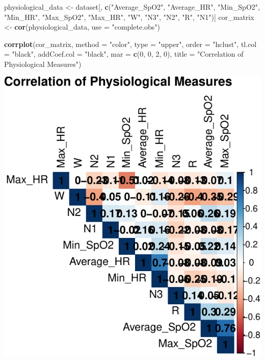 \documentclass[
]{article}
\newenvironment{Shaded}{\begin{snugshade}}{\end{snugshade}}
\newcommand{\AttributeTok}[1]{\textcolor[rgb]{0.13,0.29,0.53}{#1}}
\newcommand{\DecValTok}[1]{\textcolor[rgb]{0.00,0.00,0.81}{#1}}
\newcommand{\FunctionTok}[1]{\textcolor[rgb]{0.13,0.29,0.53}{\textbf{#1}}}
\newcommand{\NormalTok}[1]{#1}
\newcommand{\OtherTok}[1]{\textcolor[rgb]{0.56,0.35,0.01}{#1}}
\newcommand{\StringTok}[1]{\textcolor[rgb]{0.31,0.60,0.02}{#1}}
\begin{document}
\begin{Shaded}
\begin{Highlighting}[]
\NormalTok{physiological\_data }\OtherTok{\textless{}{-}}\NormalTok{ dataset[, }\FunctionTok{c}\NormalTok{(}\StringTok{"Average\_SpO2"}\NormalTok{, }\StringTok{"Average\_HR"}\NormalTok{,}
    \StringTok{"Min\_SpO2"}\NormalTok{, }\StringTok{"Min\_HR"}\NormalTok{, }\StringTok{"Max\_SpO2"}\NormalTok{, }\StringTok{"Max\_HR"}\NormalTok{, }\StringTok{"W"}\NormalTok{, }\StringTok{"N3"}\NormalTok{, }\StringTok{"N2"}\NormalTok{,}
    \StringTok{"R"}\NormalTok{, }\StringTok{"N1"}\NormalTok{)]}
\NormalTok{cor\_matrix }\OtherTok{\textless{}{-}} \FunctionTok{cor}\NormalTok{(physiological\_data, }\AttributeTok{use =} \StringTok{"complete.obs"}\NormalTok{)}

\FunctionTok{corrplot}\NormalTok{(cor\_matrix, }\AttributeTok{method =} \StringTok{"color"}\NormalTok{, }\AttributeTok{type =} \StringTok{"upper"}\NormalTok{, }\AttributeTok{order =} \StringTok{"hclust"}\NormalTok{,}
    \AttributeTok{tl.col =} \StringTok{"black"}\NormalTok{, }\AttributeTok{addCoef.col =} \StringTok{"black"}\NormalTok{, }\AttributeTok{mar =} \FunctionTok{c}\NormalTok{(}\DecValTok{0}\NormalTok{, }\DecValTok{0}\NormalTok{, }\DecValTok{2}\NormalTok{,}
        \DecValTok{0}\NormalTok{), }\AttributeTok{title =} \StringTok{"Correlation of Physiological Measures"}\NormalTok{)}
\end{Highlighting}
\end{Shaded}

\includegraphics{602_project_files/figure-latex/unnamed-chunk-14-1.pdf}
\end{document}
